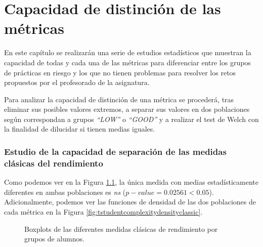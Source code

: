 \chapter{Capacidad de distinción de las métricas}\label{sec:diferencias}

En este capítulo se realizarán una serie de estudios estadísticos que muestran la capacidad de todas y cada una de las métricas para diferenciar entre los grupos de prácticas en riesgo y los que no tienen problemas para resolver los retos propuestos por el profesorado de la asignatura.

Para analizar la capacidad de distinción de una métrica se procederá, tras eliminar sus posibles valores extremos, a separar sus valores en dos poblaciones según correspondan a grupos \emph{``LOW''} o \emph{``GOOD''} y a realizar el test de Welch con la finalidad de dilucidar si tienen medias iguales.

\subsection{Estudio de la capacidad de separación de las medidas clásicas del rendimiento}

Como podemos ver en la Figura \ref{fig:tstudentcomplexityclassic}, la única medida con medias estadísticamente diferentes en ambas poblaciones es \emph{ns} ($p-value = 0.02561 < 0.05$). %
Adicionalmente, podemos ver las funciones de densidad de las dos poblaciones de cada métrica en la Figura \ref{fig:tstudentcomplexitydensityclassic}.

\begin{figure}[H]
\centering
{}%
%

%

\caption{Boxplots de las diferentes medidas clásicas de rendimiento por grupos de alumnos.}
\label{fig:tstudentcomplexityclassic}
\end{figure}

